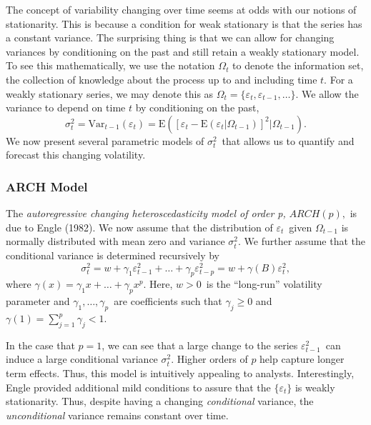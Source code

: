 The concept of variability changing over time seems at odds with our
notions of stationarity. This is because a condition for weak
stationary is that the series has a constant variance. The
surprising thing is that we can allow for changing variances by
conditioning on the past and still retain a weakly stationary model.
To see this mathematically, we use the notation $\Omega_t$ to denote
the information set, the collection of knowledge about the process
up to and including time $t$. For a weakly stationary series, we may
denote this as $\Omega
_t=\{\varepsilon_t,\varepsilon_{t-1},\ldots\}$. We allow the
variance to depend on time $t$ by conditioning on the past,
\begin{equation*}
\sigma_t^2=\mathrm{Var}_{t-1}\left( \varepsilon_t\right) =\mathrm{E}
\left( \left[ \varepsilon_t-\mathrm{E}\left( \varepsilon_t|\Omega
_{t-1}\right) \right] ^2|\Omega_{t-1}\right) .
\end{equation*}
We now present several parametric models of $\sigma_t^2$\ that
allows us to quantify and forecast this changing volatility.

\subsubsection*{ARCH Model}

The \emph{autoregressive changing heteroscedasticity model of order
p,} $ ARCH(p),$ is due to Engle (1982). We now assume that the
distribution of $ \varepsilon_t$\ given $\Omega_{t-1}$ is normally
distributed with mean zero and variance $\sigma_t^2$. We further
assume that the conditional variance is determined recursively by
\begin{equation*}
\sigma_t^2=w+\gamma_1\varepsilon_{t-1}^2+\ldots+\gamma
_{p}\varepsilon_{t-p}^2=w+\gamma (B)\varepsilon_t^2,
\end{equation*}
where $\gamma (x)=\gamma_1x+\ldots+\gamma_{p}x^{p}.$ Here, $w>0$\ is
the ``long-run'' volatility parameter and $
\gamma_1,\ldots,\gamma_p$\ are coefficients such that $\gamma _j
\geq 0$ and $\gamma (1)=\sum_{j=1}^{p} \gamma_j < 1$.

In the case that $p=1$, we can see that a large change to the series
$ \varepsilon_{t-1}^2$\ can induce a large conditional variance
$\sigma_t^2$. Higher orders of $p$ help capture longer term effects.
Thus, this model is intuitively appealing to analysts.
Interestingly, Engle provided additional mild conditions to assure
that the $\{\varepsilon_t\}$ is weakly stationarity. Thus, despite
having a changing \emph{conditional} variance, the
\emph{unconditional} variance remains constant over time.

